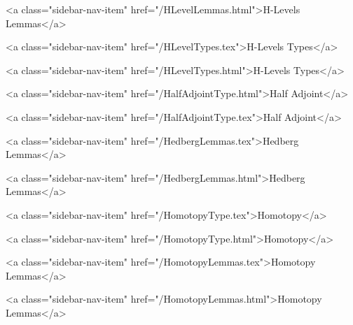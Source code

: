       
        
          <a class="sidebar-nav-item" href="/HLevelLemmas.html">H-Levels Lemmas</a>
        
      
    
      
        
          <a class="sidebar-nav-item" href="/HLevelTypes.tex">H-Levels Types</a>
        
      
    
      
        
          <a class="sidebar-nav-item" href="/HLevelTypes.html">H-Levels Types</a>
        
      
    
      
        
          <a class="sidebar-nav-item" href="/HalfAdjointType.html">Half Adjoint</a>
        
      
    
      
        
          <a class="sidebar-nav-item" href="/HalfAdjointType.tex">Half Adjoint</a>
        
      
    
      
        
          <a class="sidebar-nav-item" href="/HedbergLemmas.tex">Hedberg Lemmas</a>
        
      
    
      
        
          <a class="sidebar-nav-item" href="/HedbergLemmas.html">Hedberg Lemmas</a>
        
      
    
      
        
          <a class="sidebar-nav-item" href="/HomotopyType.tex">Homotopy</a>
        
      
    
      
        
          <a class="sidebar-nav-item" href="/HomotopyType.html">Homotopy</a>
        
      
    
      
        
          <a class="sidebar-nav-item" href="/HomotopyLemmas.tex">Homotopy Lemmas</a>
        
      
    
      
        
          <a class="sidebar-nav-item" href="/HomotopyLemmas.html">Homotopy Lemmas</a>
        
      
    
